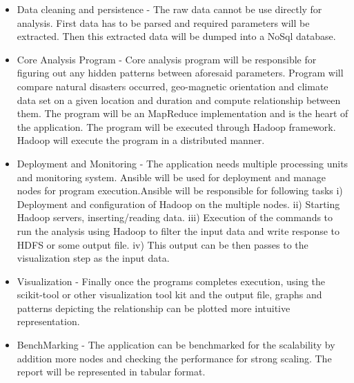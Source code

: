 \documentclass[9pt,twocolumn,twoside]{../../styles/osajnl}
\begin{document}
\begin{itemize}
\item Data cleaning and persistence - The raw data cannot be use directly for analysis. First data has to be parsed and required parameters will be extracted. Then this extracted data will be dumped into a NoSql database.
\item Core Analysis Program - Core analysis program will be responsible for figuring out any hidden patterns between aforesaid parameters. Program will compare natural disasters occurred, geo-magnetic orientation and climate data
set on a given location and duration and compute relationship between them. The program will be an
MapReduce implementation and is the heart of the application. The program will be executed through
Hadoop framework. Hadoop will execute the program in a distributed manner.
\item Deployment and Monitoring - The application needs multiple processing units and monitoring system. Ansible will be used for deployment and manage nodes for program execution.Ansible will be responsible for following tasks
i)   Deployment and configuration of Hadoop on the multiple nodes.
ii)  Starting Hadoop servers, inserting/reading data.
iii) Execution of the commands to run the analysis using Hadoop to filter the input data and write
response to HDFS or some output file.
iv)  This output can be then passes to the visualization step as the input data.
\item Visualization - Finally once the programs completes execution, using the scikit-tool or other visualization tool
kit and the output file, graphs and patterns depicting the relationship can be plotted more intuitive representation.
\item BenchMarking - The application can be benchmarked for the scalability by addition more nodes and checking the
performance for strong scaling. The report will be represented in tabular format.
\end{itemize}
\end{document}
